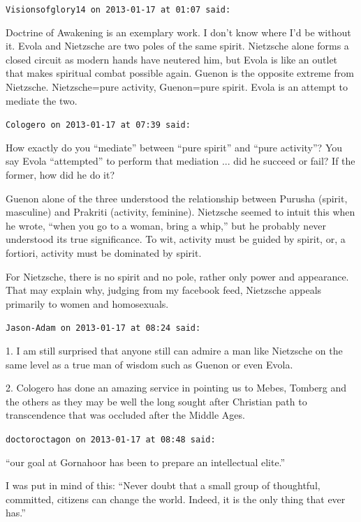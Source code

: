 \begin{footnotesize}
\begin{sffamily}
\hfill

\texttt{Visionsofglory14 on 2013-01-17 at 01:07 said:}

Doctrine of Awakening is an exemplary work. I don't know where I'd be without it. Evola and Nietzsche are two poles of the same spirit. Nietzsche alone forms a closed circuit as modern hands have neutered him, but Evola is like an outlet that makes spiritual combat possible again. Guenon is the opposite extreme from Nietzsche. Nietzsche=pure activity, Guenon=pure spirit. Evola is an attempt to mediate the two.

\hfill

\texttt{Cologero on 2013-01-17 at 07:39 said:}

How exactly do you ``mediate'' between ``pure spirit'' and ``pure activity''? You say Evola ``attempted'' to perform that mediation ... did he succeed or fail? If the former, how did he do it?


Guenon alone of the three understood the relationship between Purusha (spirit, masculine) and Prakriti (activity, feminine). Nietzsche seemed to intuit this when he wrote, ``when you go to a woman, bring a whip,'' but he probably never understood its true significance. To wit, activity must be guided by spirit, or, a fortiori, activity must be dominated by spirit.

For Nietzsche, there is no spirit and no pole, rather only power and appearance. That may explain why, judging from my facebook feed, Nietzsche appeals primarily to women and homosexuals.

\hfill

\texttt{Jason-Adam on 2013-01-17 at 08:24 said:}

1. I am still surprised that anyone still can admire a man like Nietzsche on the same level as a true man of wisdom such as Guenon or even Evola.

2. Cologero has done an amazing service in pointing us to Mebes, Tomberg and the others as they may be well the long sought after Christian path to transcendence that was occluded after the Middle Ages.

\hfill

\texttt{doctoroctagon on 2013-01-17 at 08:48 said:}

``our goal at Gornahoor has been to prepare an intellectual elite.''

I was put in mind of this: ``Never doubt that a small group of thoughtful, committed, citizens can change the world. Indeed, it is the only thing that ever has.''


\end{sffamily}
\end{footnotesize}

